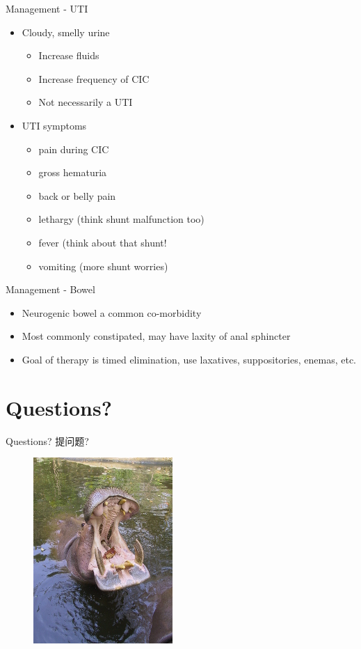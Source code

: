\begin{frame}{Management - UTI}

\begin{itemize}
\itemsep1pt\parskip0pt
\item
  Cloudy, smelly urine

  \begin{itemize}
  \itemsep1pt\parskip0pt
  \item
    Increase fluids
  \item
    Increase frequency of CIC
  \item
    Not necessarily a UTI
  \end{itemize}
\item
  UTI symptoms

  \begin{itemize}
  \itemsep1pt\parskip0pt
  \item
    pain during CIC
  \item
    gross hematuria
  \item
    back or belly pain
  \item
    lethargy (think shunt malfunction too)
  \item
    fever (think about that shunt!
  \item
    vomiting (more shunt worries)
  \end{itemize}
\end{itemize}

\end{frame}

\begin{frame}{Management - Bowel}

\begin{itemize}
\itemsep1pt\parskip0pt
\item
  Neurogenic bowel a common co-morbidity
\item
  Most commonly constipated, may have laxity of anal sphincter
\item
  Goal of therapy is timed elimination, use laxatives, suppositories,
  enemas, etc.
\end{itemize}

\end{frame}

\section{Questions?}\label{questions}

\begin{frame}{Questions? 提问题?}

\begin{figure}[htbp]
\centering
\includegraphics{./img/img_0510_200.jpg}
\caption{}
\end{figure}

\end{frame}
